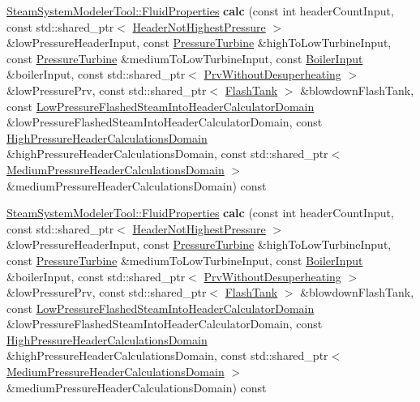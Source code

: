 \begin{DoxyCompactItemize}
\hyperlink{struct_steam_system_modeler_tool_1_1_fluid_properties}{Steam\+System\+Modeler\+Tool\+::\+Fluid\+Properties} {\bfseries calc} (const int header\+Count\+Input, const std\+::shared\+\_\+ptr$<$ \hyperlink{class_header_not_highest_pressure}{Header\+Not\+Highest\+Pressure} $>$ \&low\+Pressure\+Header\+Input, const \hyperlink{class_pressure_turbine}{Pressure\+Turbine} \&high\+To\+Low\+Turbine\+Input, const \hyperlink{class_pressure_turbine}{Pressure\+Turbine} \&medium\+To\+Low\+Turbine\+Input, const \hyperlink{class_boiler_input}{Boiler\+Input} \&boiler\+Input, const std\+::shared\+\_\+ptr$<$ \hyperlink{class_prv_without_desuperheating}{Prv\+Without\+Desuperheating} $>$ \&low\+Pressure\+Prv, const std\+::shared\+\_\+ptr$<$ \hyperlink{class_flash_tank}{Flash\+Tank} $>$ \&blowdown\+Flash\+Tank, const \hyperlink{class_low_pressure_flashed_steam_into_header_calculator_domain}{Low\+Pressure\+Flashed\+Steam\+Into\+Header\+Calculator\+Domain} \&low\+Pressure\+Flashed\+Steam\+Into\+Header\+Calculator\+Domain, const \hyperlink{class_high_pressure_header_calculations_domain}{High\+Pressure\+Header\+Calculations\+Domain} \&high\+Pressure\+Header\+Calculations\+Domain, const std\+::shared\+\_\+ptr$<$ \hyperlink{class_medium_pressure_header_calculations_domain}{Medium\+Pressure\+Header\+Calculations\+Domain} $>$ \&medium\+Pressure\+Header\+Calculations\+Domain) const
\item 
\mbox{\label{class_low_pressure_header_calculator_a7fb9b679355ee5dceee19f2d78a2e6d2}} 
\hyperlink{struct_steam_system_modeler_tool_1_1_fluid_properties}{Steam\+System\+Modeler\+Tool\+::\+Fluid\+Properties} {\bfseries calc} (const int header\+Count\+Input, const std\+::shared\+\_\+ptr$<$ \hyperlink{class_header_not_highest_pressure}{Header\+Not\+Highest\+Pressure} $>$ \&low\+Pressure\+Header\+Input, const \hyperlink{class_pressure_turbine}{Pressure\+Turbine} \&high\+To\+Low\+Turbine\+Input, const \hyperlink{class_pressure_turbine}{Pressure\+Turbine} \&medium\+To\+Low\+Turbine\+Input, const \hyperlink{class_boiler_input}{Boiler\+Input} \&boiler\+Input, const std\+::shared\+\_\+ptr$<$ \hyperlink{class_prv_without_desuperheating}{Prv\+Without\+Desuperheating} $>$ \&low\+Pressure\+Prv, const std\+::shared\+\_\+ptr$<$ \hyperlink{class_flash_tank}{Flash\+Tank} $>$ \&blowdown\+Flash\+Tank, const \hyperlink{class_low_pressure_flashed_steam_into_header_calculator_domain}{Low\+Pressure\+Flashed\+Steam\+Into\+Header\+Calculator\+Domain} \&low\+Pressure\+Flashed\+Steam\+Into\+Header\+Calculator\+Domain, const \hyperlink{class_high_pressure_header_calculations_domain}{High\+Pressure\+Header\+Calculations\+Domain} \&high\+Pressure\+Header\+Calculations\+Domain, const std\+::shared\+\_\+ptr$<$ \hyperlink{class_medium_pressure_header_calculations_domain}{Medium\+Pressure\+Header\+Calculations\+Domain} $>$ \&medium\+Pressure\+Header\+Calculations\+Domain) const
\end{DoxyCompactItemize}


